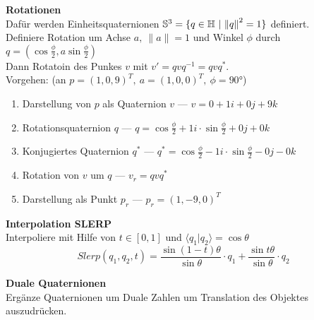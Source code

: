 \textbf{Rotationen}\\
Dafür werden Einheitsquaternionen \(\mathbb{S}^3 = \{q \in \quaternionen\ \lvert\ {\|{q}\|}^2 = 1\}\) definiert.\\
Definiere Rotation um Achse \(a,\ \|a\| = 1\) und Winkel \(\phi\) durch \(q = (\cos \frac{\phi}{2}, a \sin \frac{\phi}{2})\)\\
Dann Rotatoin des Punkes \(v\) mit \(v' = qvq^{-1} = qvq^*\).\\
Vorgehen: (an \(p = {(1, 0, 9)}^T,\ a = {(1, 0, 0)}^T,\ \phi = \ang{90}\))
\begin{enumerate}
\item Darstellung von \(p\) als Quaternion \(v\) --- \(v = 0 + 1i + 0j + 9k\)
\item Rotationsquaternion \(q\) --- \( q = \cos \frac{\phi}{2} + 1i \cdot \sin \frac{\phi}{2} + 0j + 0k\)
\item Konjugiertes Quaternion \(q^*\) --- \(q^* = \cos \frac{\phi}{2} - 1i \cdot \sin \frac{\phi}{2} - 0j -0k\)
\item Rotation von \(v\) um \(q\) --- \(v_r = qvq^*\)
\item Darstellung als Punkt \(p_r\) --- \(p_r = {(1, -9, 0)}^T\)
\end{enumerate}

\textbf{Interpolation SLERP}\\
Interpoliere mit Hilfe von \(t \in [0, 1]\) und \(\langle q_1 \lvert q_2 \rangle = \cos \theta\)
\[ \mathit{Slerp}(q_1, q_2, t) = \frac{\sin(1-t)\theta}{\sin \theta} \cdot q_1 + \frac{\sin t\theta}{\sin \theta} \cdot q_2 \]

\textbf{Duale Quaternionen}\\
Ergänze Quaternionen um Duale Zahlen um Translation des Objektes auszudrücken.